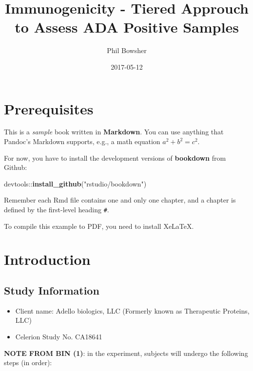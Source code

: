 \documentclass[]{book}
\title{Immunogenicity - Tiered Approuch to Assess ADA Positive Samples}
\author{Phil Bowsher}
\date{2017-05-12}
\newenvironment{Shaded}{\begin{snugshade}}{\end{snugshade}}
\newcommand{\KeywordTok}[1]{\textcolor[rgb]{0.13,0.29,0.53}{\textbf{{#1}}}}
\newcommand{\StringTok}[1]{\textcolor[rgb]{0.31,0.60,0.02}{{#1}}}
\newcommand{\NormalTok}[1]{{#1}}
\providecommand{\tightlist}{%
  \setlength{\itemsep}{0pt}\setlength{\parskip}{0pt}}
\begin{document}
\maketitle

{
\setcounter{tocdepth}{1}
\tableofcontents
}
\chapter{Prerequisites}\label{prerequisites}

This is a \emph{sample} book written in \textbf{Markdown}. You can use
anything that Pandoc's Markdown supports, e.g., a math equation
\(a^2 + b^2 = c^2\).

For now, you have to install the development versions of
\textbf{bookdown} from Github:

\begin{Shaded}
\begin{Highlighting}[]
\NormalTok{devtools::}\KeywordTok{install_github}\NormalTok{(}\StringTok{"rstudio/bookdown"}\NormalTok{)}
\end{Highlighting}
\end{Shaded}

Remember each Rmd file contains one and only one chapter, and a chapter
is defined by the first-level heading \texttt{\#}.

To compile this example to PDF, you need to install XeLaTeX.

\chapter{Introduction}\label{intro}

\section{Study Information}\label{study-information}

\begin{itemize}
\tightlist
\item
  Client name: Adello biologics, LLC (Formerly known as Therapeutic
  Proteins, LLC)
\item
  Celerion Study No. CA18641
\end{itemize}

\textbf{NOTE FROM BIN (1)}: in the experiment, subjects will undergo the
following steps (in order):
\end{document}
